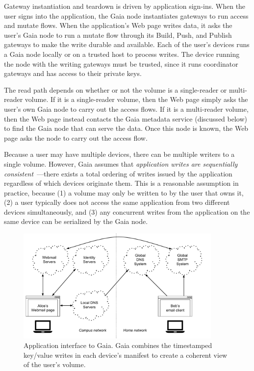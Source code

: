 Gateway instantiation and teardown is driven by application sign-ins.
When the user signs into the application, the Gaia node instantiates gateways to
run access and mutate flows.  When the application's Web page writes data,
it asks the user's Gaia node to run a mutate flow through its Build, Push, and
Publish gateways to make the write durable and available.
Each of the user's devices runs a Gaia node locally or on a trusted host to
process writes.  The device running the node with the writing gateways
must be trusted, since it runs coordinator gateways and has access to their
private keys.

The read path depends on whether or not the volume is a single-reader or
multi-reader volume.  If it is a single-reader volume, then the Web page simply
asks the user's own Gaia node to carry out the access flows.  If it is a
multi-reader volume, then the Web page instead contacts the Gaia metadata
service (discussed below) to find the Gaia node that can serve the data.
Once this node is known, the Web page asks the node to
carry out the access flow.

Because a user may have multiple devices, there can be multiple writers to
a single volume.  However, Gaia assumes that \emph{application writes are
sequentially consistent}~\cite{sequential-consistency}---there exists a total
ordering of writes issued by the application regardless of which devices
originate them.  This is a reasonable assumption in practice, because
(1) a volume may only be written to by the user
that owns it, (2) a user typically does not access the same application from
two different devices simultaneously, and (3) any concurrent writes from the
application on the same device can be serialized by the Gaia node.

\begin{figure}[h]
   \centering
   \includegraphics[width=0.9\textwidth,page=17]{figures/dissertation-figures}
   \caption{Application interface to Gaia.  Gaia combines the timestamped
   key/value writes in each device's manifest to create a coherent view of the
   user's volume.}
   \label{fig:chap3-gaia-global-key-value-store}
\end{figure}

